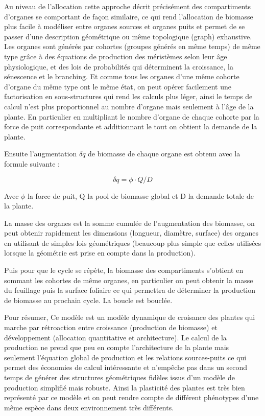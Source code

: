 Au niveau de l’allocation cette approche décrit précisément des compartiments d’organes se comportant de façon similaire, ce qui rend l’allocation de biomasse plus facile à modéliser entre organes sources et organes puits et permet de se passer d’une description géométrique ou même topologique (graph) exhaustive. Les organes sont générés par cohortes (groupes générés en même temps) de même type grâce à des équations de production des méristèmes selon leur âge physiologique, et des lois de probabilités qui déterminent la croissance, la sénescence et le branching. Et comme tous les organes d’une même cohorte d’organe du même type ont le même état, on peut opérer facilement une factorisation en sous-structures qui rend les calculs plus léger, ainsi le temps de calcul n’est plus proportionnel au nombre d’organe mais seulement à l’âge de la plante. En particulier en multipliant le nombre d’organe de chaque cohorte par la force de puit correspondante et additionnant le tout on obtient la demande de la plante.

Ensuite l’augmentation $\delta q$ de biomasse de chaque organe est obtenu avec la formule suivante :

\[ \delta q = \phi \cdot Q/D \]

Avec $\phi$ la force de puit, Q la pool de biomasse global et D la demande totale de la plante.

La masse des organes est la somme cumulée de l’augmentation des biomasse, on peut obtenir rapidement les dimensions (longueur, diamètre, surface) des organes en utilisant de simples lois géométriques (beaucoup plus simple que celles utilisées lorsque la géométrie est prise en compte dans la production). 

Puis pour que le cycle se répète, la biomasse des compartiments s’obtient  en sommant les cohortes de même organes, en particulier on peut obtenir la masse du feuillage puis la surface foliaire ce qui permettra de déterminer la production de biomasse au prochain cycle. La boucle est bouclée.

Pour résumer, Ce modèle est un modèle dynamique de croisance des plantes qui marche par rétroaction entre croissance (production de biomasse) et développement (allocation quantitative et architecture). Le calcul de la production ne prend que peu en compte l’architecture de la plante mais seulement l’équation global de production et les relations sources-puits ce qui permet des économies de calcul intéressante et n’empêche pas dans un second temps de générer des structures géométriques fidèles issus d’un modèle de production simplifié mais robuste. Ainsi la plasticité des plantes est très bien représenté par ce modèle et on peut rendre compte de différent phénotypes d’une même espèce dans deux environnement très différents.

